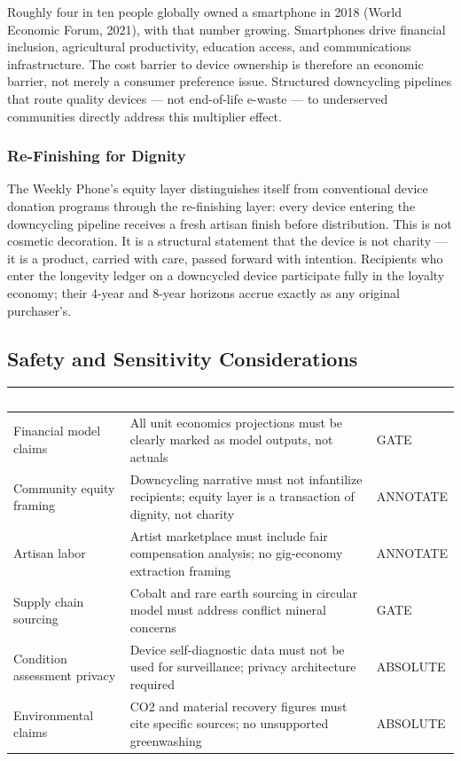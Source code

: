 \documentclass[11pt,letterpaper]{article}
\newcommand{\tableheader}[1]{\textbf{\sffamily\textcolor{white}{#1}}}
\begin{document}
Roughly four in ten people globally owned a smartphone in 2018 (World Economic Forum, 2021), with that number growing. Smartphones drive financial inclusion, agricultural productivity, education access, and communications infrastructure. The cost barrier to device ownership is therefore an economic barrier, not merely a consumer preference issue. Structured downcycling pipelines that route quality devices --- not end-of-life e-waste --- to underserved communities directly address this multiplier effect.

\subsubsection{Re-Finishing for Dignity}

The Weekly Phone's equity layer distinguishes itself from conventional device donation programs through the re-finishing layer: every device entering the downcycling pipeline receives a fresh artisan finish before distribution. This is not cosmetic decoration. It is a structural statement that the device is not charity --- it is a product, carried with care, passed forward with intention. Recipients who enter the longevity ledger on a downcycled device participate fully in the loyalty economy; their 4-year and 8-year horizons accrue exactly as any original purchaser's.

\subsection{Safety and Sensitivity Considerations}

\begin{center}
\begin{tabularx}{\textwidth}{L{4cm}XC{2cm}}
\toprule
{}
\tableheader{Area} & \tableheader{Consideration} & \tableheader{Type} \\
\midrule
Financial model claims & All unit economics projections must be clearly marked as model outputs, not actuals & GATE \\
Community equity framing & Downcycling narrative must not infantilize recipients; equity layer is a transaction of dignity, not charity & ANNOTATE \\
Artisan labor & Artist marketplace must include fair compensation analysis; no gig-economy extraction framing & ANNOTATE \\
Supply chain sourcing & Cobalt and rare earth sourcing in circular model must address conflict mineral concerns & GATE \\
Condition assessment privacy & Device self-diagnostic data must not be used for surveillance; privacy architecture required & ABSOLUTE \\
Environmental claims & CO2 and material recovery figures must cite specific sources; no unsupported greenwashing & ABSOLUTE \\
\bottomrule
\end{tabularx}
\end{center}
\end{document}
